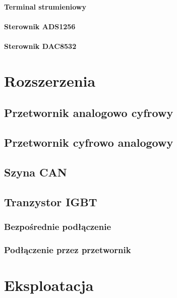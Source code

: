\documentclass[
12pt, %
a4paper
]{report}
\begin{document}
                \subsubsection{Terminal strumieniowy}
                
                \subsubsection{Sterownik ADS1256}
                
                \subsubsection{Sterownik DAC8532}
                

	\chapter{Rozszerzenia}
        \section{Przetwornik analogowo cyfrowy}
        
        \section{Przetwornik cyfrowo analogowy}
        
        \section{Szyna CAN}
        
        \section{Tranzystor IGBT}
        
            \subsection{Bezpośrednie podłączenie}
            
            \subsection{Podłączenie przez przetwornik}
            
	\chapter{Eksploatacja}
\end{document}
